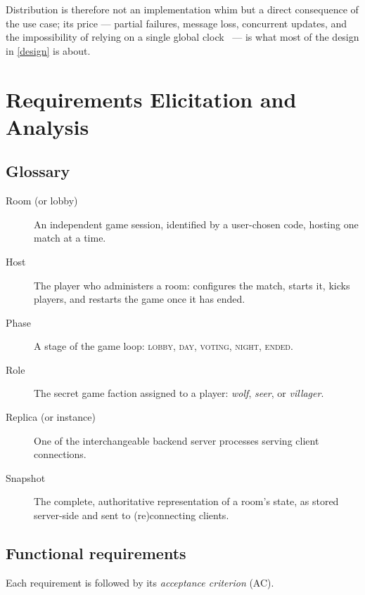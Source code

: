 \documentclass{scrartcl}
\begin{document}
Distribution is therefore not an implementation whim but a direct consequence
of the use case; its price --- partial failures, message loss, concurrent
updates, and the impossibility of relying on a single global clock~\cite{lamport1978time} ---
is what most of the design in \cref{design} is about.

\section{Requirements Elicitation and Analysis}\label{requirements}

\subsection{Glossary}

\begin{description}
  \item[Room (or lobby)] An independent game session, identified by a
  user-chosen code, hosting one match at a time.
  \item[Host] The player who administers a room: configures the match,
  starts it, kicks players, and restarts the game once it has ended.
  \item[Phase] A stage of the game loop: \textsc{lobby}, \textsc{day},
  \textsc{voting}, \textsc{night}, \textsc{ended}.
  \item[Role] The secret game faction assigned to a player: \emph{wolf},
  \emph{seer}, or \emph{villager}.
  \item[Replica (or instance)] One of the interchangeable backend server
  processes serving client connections.
  \item[Snapshot] The complete, authoritative representation of a room's
  state, as stored server-side and sent to (re)connecting clients.
\end{description}

\subsection{Functional requirements}

Each requirement is followed by its \emph{acceptance criterion} (AC).
\end{document}
